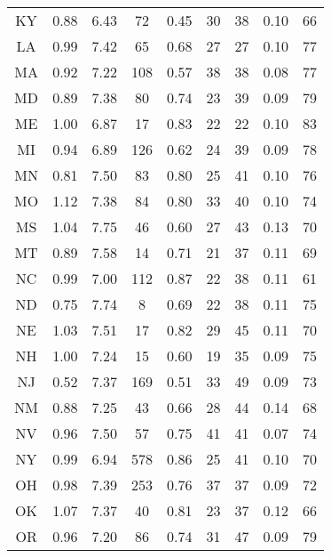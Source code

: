 \begin{table}
\begin{tabular}{ccccccccc}
   KY &    0.88 &  6.43 &    72 &     0.45 &      30 &        38 &   0.10 &        66 \\
   LA &    0.99 &  7.42 &    65 &     0.68 &      27 &        27 &   0.10 &        77 \\
   MA &    0.92 &  7.22 &   108 &     0.57 &      38 &        38 &   0.08 &        77 \\
   MD &    0.89 &  7.38 &    80 &     0.74 &      23 &        39 &   0.09 &        79 \\
   ME &    1.00 &  6.87 &    17 &     0.83 &      22 &        22 &   0.10 &        83 \\
   MI &    0.94 &  6.89 &   126 &     0.62 &      24 &        39 &   0.09 &        78 \\
   MN &    0.81 &  7.50 &    83 &     0.80 &      25 &        41 &   0.10 &        76 \\
   MO &    1.12 &  7.38 &    84 &     0.80 &      33 &        40 &   0.10 &        74 \\
   MS &    1.04 &  7.75 &    46 &     0.60 &      27 &        43 &   0.13 &        70 \\
   MT &    0.89 &  7.58 &    14 &     0.71 &      21 &        37 &   0.11 &        69 \\
   NC &    0.99 &  7.00 &   112 &     0.87 &      22 &        38 &   0.11 &        61 \\
   ND &    0.75 &  7.74 &     8 &     0.69 &      22 &        38 &   0.11 &        75 \\
   NE &    1.03 &  7.51 &    17 &     0.82 &      29 &        45 &   0.11 &        70 \\
   NH &    1.00 &  7.24 &    15 &     0.60 &      19 &        35 &   0.09 &        75 \\
   NJ &    0.52 &  7.37 &   169 &     0.51 &      33 &        49 &   0.09 &        73 \\
   NM &    0.88 &  7.25 &    43 &     0.66 &      28 &        44 &   0.14 &        68 \\
   NV &    0.96 &  7.50 &    57 &     0.75 &      41 &        41 &   0.07 &        74 \\
   NY &    0.99 &  6.94 &   578 &     0.86 &      25 &        41 &   0.10 &        70 \\
   OH &    0.98 &  7.39 &   253 &     0.76 &      37 &        37 &   0.09 &        72 \\
   OK &    1.07 &  7.37 &    40 &     0.81 &      23 &        37 &   0.12 &        66 \\
   OR &    0.96 &  7.20 &    86 &     0.74 &      31 &        47 &   0.09 &        79 \\

\end{tabular}
\end{table}

